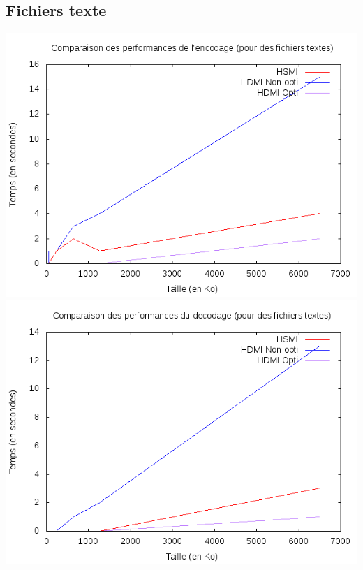 \documentclass{article}
\begin{document}
\subsection{Fichiers texte}
\begin{center}
\includegraphics[scale=0.5]{Perf/txt/encodecomptxt2.png}
\includegraphics[scale=0.5]{Perf/txt/decodecomptxt2.png}
\end{center}
\end{document}
